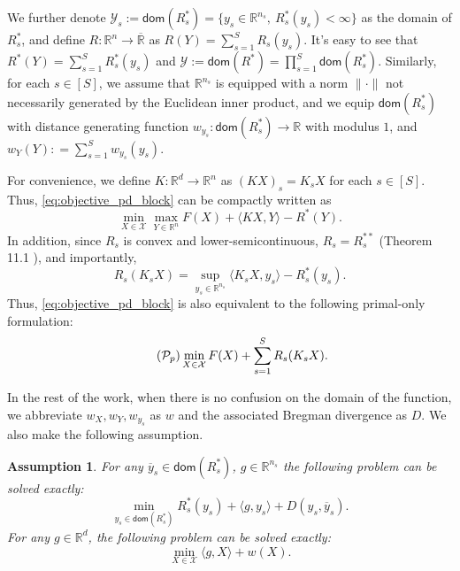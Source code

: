 \documentclass[10pt]{article}
\newcommand{\mc}{\mathcal}
\newcommand{\R}{\mathbb{R}}
\newcommand{\domain}{\mathsf{dom}}
\newtheorem{assumption}{Assumption}[section]
\begin{document}
We further denote $\mc Y_s:=\domain(R_s^*) = \{y_s\in \R^{n_s},~R_s^*(y_s)<\infty\}$ as the domain of $R_s^*$, and define $R:\R^n\to \overline{\R}$ as $R(Y) = \sum_{s=1}^S R_s(y_s)$. It's easy to see that $R^*(Y) = \sum_{s=1}^S R_s^*(y_s)$ and $\mc Y:=\domain(R^*) = \prod_{s=1}^S \domain(R_s^*)$. Similarly, for each $s\in [S]$, we assume that $\R^{n_s}$ is equipped with a norm $\|\cdot\|$ not necessarily generated by the Euclidean inner product, and we equip $\domain(R_s^*)$ with distance generating function $w_{y_s}:\domain(R^*_s)\to \R$ with modulus $1$, and $w_Y(Y): = \sum_{s=1}^S w_{y_s}(y_s)$. 

For convenience, we define $K:\R^d\to \R^n$ as $(KX)_s = K_sX$ for each $s\in [S]$. Thus, \eqref{eq:objective_pd_block} can be compactly written as
\begin{equation}\label{eq:compact}\tag{$\mc P_c$}
    \min_{X\in \mc X} \max_{Y\in \R^n} F(X) +\langle KX,Y\rangle  - R^*(Y).
\end{equation}
In addition, since $R_s$ is convex and lower-semicontinuous, $R_s = R_s^{**}$ (Theorem 11.1 \cite{rockafellarVariational}), and importantly, 
\begin{equation*} 
    R_s(K_sX) = \sup_{y_s\in \R^{n_s}} \langle K_sX,y_s\rangle - R_s^*(y_s).
\end{equation*}
Thus, \eqref{eq:objective_pd_block} is also equivalent to the following primal-only formulation:
\begin{equation}\label{eq:objective_pd_block-primal}\tag{$\mc P_{p}$}
        \min_{X\in {\mc X}}F(X) + \sum_{s=1}^S R_s(K_sX).
\end{equation}

In the rest of the work, when there is no confusion on the domain of the function, we abbreviate $w_{X},w_Y, w_{y_s}$ as $w$ and the associated Bregman divergence as $D$. We also make the following assumption. 
\begin{assumption}\label{assumption:bregman_easy}
For any $\overline{y}_s\in \domain(R^*_s)$, $g\in \R^{n_s}$ the following problem can be solved exactly:
\begin{displaymath}
    \min_{y_s\in \domain(R^*_s)} R_s^*(y_s) +\langle g,y_s\rangle+ D(y_s,\overline{y}_s).
\end{displaymath}
For any $g\in \R^d$, the following problem can be solved exactly:
\begin{displaymath}
    \min_{X\in \mc X} \langle g,X\rangle + w(X).
\end{displaymath}
\end{assumption}
\end{document}
